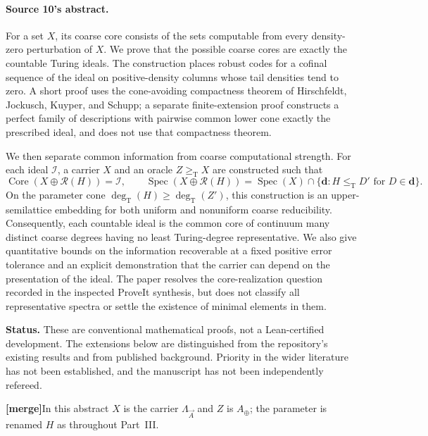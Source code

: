 \documentclass[11pt,letterpaper]{article}
\theoremstyle{plain}
\theoremstyle{definition}
\theoremstyle{remark}
\numberwithin{equation}{section}
\newcommand{\leT}{\leq_{\mathrm T}}
\newcommand{\geT}{\geq_{\mathrm T}}
\newcommand{\Core}{\operatorname{Core}}
\newcommand{\Spec}{\operatorname{Spec}}
\newcommand{\degT}{\deg_{\mathrm T}}
\newcommand{\Rcode}{\mathcal R}
\newcommand{\I}{\mathcal I}
\newcommand{\mergenote}[1]{\par\smallskip\noindent
 {\small\textsf{\textbf{[merge]}}\enspace #1}\par\smallskip}
\newcommand{\Aplus}{A_{\oplus}}          %
\newcommand{\Lam}{\Lambda_{\vec A}}      %
\begin{document}
\paragraph{Source 10's abstract.}
{\small For a set $X$, its coarse core consists of the sets computable from every
density-zero perturbation of $X$. We prove that the possible coarse cores are exactly
the countable Turing ideals. The construction places robust codes for a cofinal
sequence of the ideal on positive-density columns whose tail densities tend to zero. A
short proof uses the cone-avoiding compactness theorem of Hirschfeldt, Jockusch,
Kuyper, and Schupp; a separate finite-extension proof constructs a perfect family of
descriptions with pairwise common lower cone exactly the prescribed ideal, and does not
use that compactness theorem.

We then separate common information from coarse computational strength. For each ideal
$\I$, a carrier $X$ and an oracle $Z\geT X$ are constructed such that
\[
 \Core(X\oplus\Rcode(H))=\I,\qquad
 \Spec(X\oplus\Rcode(H))=\Spec(X)\cap
 \{\mathbf d:H\leT D'\text{ for }D\in\mathbf d\}.
\]
On the parameter cone $\degT(H)\geq\degT(Z')$, this construction is an
upper-semilattice embedding for both uniform and nonuniform coarse reducibility.
Consequently, each countable ideal is the common core of continuum many distinct coarse
degrees having no least Turing-degree representative. We also give quantitative bounds
on the information recoverable at a fixed positive error tolerance and an explicit
demonstration that the carrier can depend on the presentation of the ideal. The paper
resolves the core-realization question recorded in the inspected ProveIt synthesis, but
does not classify all representative spectra or settle the existence of minimal
elements in them.

\textbf{Status.} These are conventional mathematical proofs, not a Lean-certified
development. The extensions below are distinguished from the repository's existing
results and from published background. Priority in the wider literature has not been
established, and the manuscript has not been independently refereed.\par}

\mergenote{In this abstract $X$ is the carrier $\Lam$ and $Z$ is $\Aplus$; the parameter
is renamed $H$ as throughout Part~III.}
\end{document}
